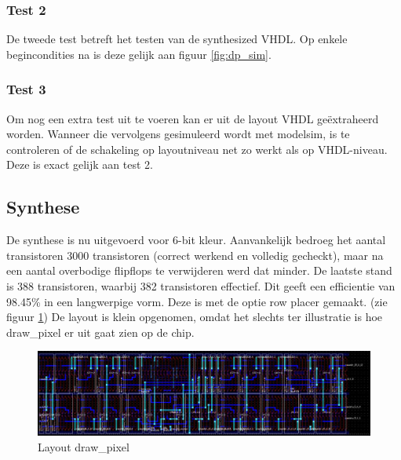 \documentclass{scrartcl} %
\begin{document}
\subsubsection{Test 2}
De tweede test betreft het testen van de synthesized VHDL. Op enkele begincondities na is deze gelijk aan  figuur \ref{fig:dp_sim}. 

\subsubsection{Test 3}
Om nog een extra test uit te voeren kan er uit de layout VHDL geëxtraheerd worden. Wanneer die vervolgens gesimuleerd wordt met modelsim, is te controleren of de schakeling op layoutniveau net zo werkt als op VHDL-niveau. Deze is exact gelijk aan test 2. 
\subsection{Synthese}
De synthese is nu uitgevoerd voor 6-bit kleur. Aanvankelijk bedroeg het aantal transistoren 3000 transistoren (correct werkend en volledig gecheckt), maar na een aantal overbodige flipflops te verwijderen werd dat minder. De laatste stand is 388 transistoren, waarbij 382 transistoren effectief. Dit geeft een efficientie van 98.45\% in een langwerpige vorm. Deze is met de optie row placer gemaakt. (zie figuur \ref{fig:dp_layout}) De layout is klein opgenomen, omdat het slechts ter illustratie is hoe draw\_pixel er uit gaat zien op de chip. 
\begin{figure} [h!]
\centering
\includegraphics [scale = 0.135] {resource/dp_layout-rc.jpg}
\caption{Layout draw\_pixel}
\label{fig:dp_layout}
\end{figure}

\newpage
\end{document}
